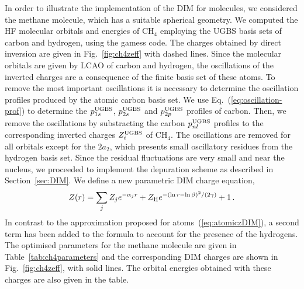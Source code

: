 \documentclass[10pt]{article}
\begin{document}
In order to illustrate the implementation of the DIM for molecules, 
we considered the methane molecule, which has a suitable
spherical geometry. We computed the HF molecular orbitals and 
energies of CH$_4$ employing the UGBS basis sets of carbon and 
hydrogen, using the {\sc gamess} code. 
The charges obtained by direct inversion are given in 
Fig.~\ref{fig:ch4zeff} with dashed lines. 
Since the molecular orbitals are given by LCAO of carbon and 
hydrogen, the oscillations of the inverted charges are a 
consequence of the finite basis set of these atoms. To remove the
most important oscillations it is necessary 
to determine the oscillation profiles produced by the atomic carbon basis set.
We use Eq.~(\ref{eq:oscillation-prof}) to determine the 
$p_{1s}^{\mbox{\scriptsize UGBS}}$, $p_{2s}^{\mbox{\scriptsize UGBS}}$ 
and $p_{2p}^{\mbox{\scriptsize UGBS}}$ profiles of carbon. 
Then, we remove the oscillations by 
substracting the carbon $p_{nl}^{\mbox{\scriptsize UGBS}}$ profiles 
to the corresponding inverted charges 
$Z_{i}^{\mbox{\scriptsize UGBS}}$ of CH$_4$.
The oscillations are removed for all orbitals except for the 
$2a_2$, which presents small oscillatory residues from the 
hydrogen basis set. Since the residual fluctuations are very small
and near the nucleus, we proceeded to implement the depuration 
scheme as described in Section~\ref{sec:DIM}. We define a new 
parametric DIM charge equation,
\begin{eqnarray}
 Z(r) = \sum_j Z_j e^{-\alpha_j r} 
 + Z_{\mbox{\scriptsize H}} e^{-(\ln r - \ln \beta)^2/(2\gamma)} 
 + 1\,.
 \label{eq:moleculezDIM}
\end{eqnarray}
In contrast to the approximation proposed for 
atoms~(\ref{eq:atomiczDIM}), a second term has been added to the 
formula to account for the presence of the hydrogens.
The optimised parameters for the methane molecule are given in 
Table~\ref{tab:ch4parameters} and the corresponding DIM 
charges are shown in Fig.~\ref{fig:ch4zeff}, with solid lines. 
The orbital energies obtained with these charges are also given in 
the table.
\end{document}
